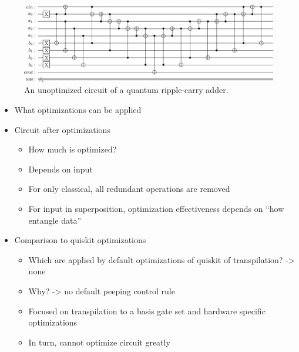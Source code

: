 \begin{figure}[htp]
    \centering     
    \includegraphics[width=\textwidth]{../figures/images/adderCircuit.png}
    \caption{An unoptimized circuit of a quantum ripple-carry adder.}
    \label{fig:eval_adder_circuit}
\end{figure}

\begin{itemize}
    \item What optimizations can be applied
    \item Circuit after optimizations
    \begin{itemize}
        \item How much is optimized?
        \item Depends on input
        \item For only classical, all redundant operations are removed
        \item For input in superposition, optimization effectiveness depends on ``how entangle data''
    \end{itemize}
    \item Comparison to quiskit optimizations
    \begin{itemize}
        \item Which are applied by default optimizations of quiskit of transpilation? -> none
        \item Why? -> no default peeping control rule
        \item Focused on transpilation to a basis gate set and hardware specific optimizations 
        \item In turn, cannot optimize circuit greatly
    \end{itemize}
\end{itemize}


